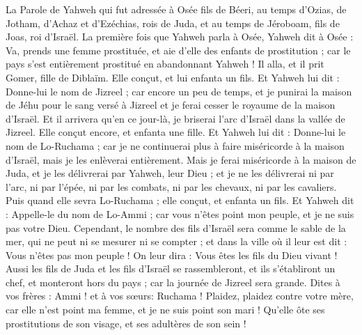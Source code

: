 \begin{multicols}{2}
\VerseOne{}La Parole de Yahweh qui fut adressée à Osée fils de Béeri, au temps d'Ozias, de Jotham, d'Achaz et d'Ezéchias, rois de Juda, et au temps de Jéroboam, fils de Joas, roi d'Israël.
La première fois que Yahweh parla à Osée, Yahweh dit à Osée : Va, prends une femme prostituée, et aie d'elle des enfants de prostitution ; car le pays s'est entièrement prostitué en abandonnant Yahweh !
Il alla, et il prit Gomer, fille de Diblaïm. Elle conçut, et lui enfanta un fils.
Et Yahweh lui dit : Donne-lui le nom de Jizreel ; car encore un peu de temps, et je punirai la maison de Jéhu pour le sang versé à Jizreel et je ferai cesser le royaume de la maison d'Israël.
Et il arrivera qu'en ce jour-là, je briserai l'arc d'Israël dans la vallée de Jizreel.
Elle conçut encore, et enfanta une fille. Et Yahweh lui dit : Donne-lui le nom de Lo-Ruchama  ; car je ne continuerai plus à faire miséricorde à la maison d'Israël, mais je les enlèverai entièrement.
Mais je ferai miséricorde à la maison de Juda, et je les délivrerai par Yahweh, leur Dieu ; et je ne les délivrerai ni par l'arc, ni par l'épée, ni par les combats, ni par les chevaux, ni par les cavaliers.
Puis quand elle sevra Lo-Ruchama ; elle conçut, et enfanta un fils.
Et Yahweh dit : Appelle-le du nom de Lo-Ammi ; car vous n'êtes point mon peuple, et je ne suis pas votre Dieu.
\VerseOne{}Cependant, le nombre des fils d'Israël sera comme le sable de la mer, qui ne peut ni se mesurer ni se compter ; et dans la ville où il leur est dit : Vous n'êtes pas mon peuple ! On leur dira : Vous êtes les fils du Dieu vivant !
Aussi les fils de Juda et les fils d'Israël se rassembleront, et ils s'établiront un chef, et monteront hors du pays ; car la journée de Jizreel sera grande.
Dites à vos frères : Ammi ! et à vos sœurs: Ruchama !
Plaidez, plaidez contre votre mère, car elle n'est point ma femme, et je ne suis point son mari ! Qu'elle ôte ses prostitutions de son visage, et ses adultères de son sein !

\end{multicols}
